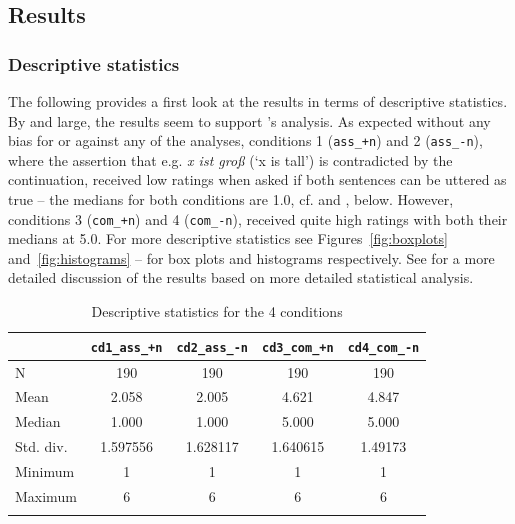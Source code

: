 \documentclass[output=paper]{langsci/langscibook}
\begin{document}
\subsection{Results}

\subsubsection{Descriptive statistics}

The following provides a first look at the results in terms of descriptive statistics. By and large, the results seem to support \citeauthor{umbach2009a_comp}'s \citeyearpar{umbach2009a_comp} analysis. As expected without any bias for or against any of the analyses, conditions 1 (\texttt{ass\_+n}) and 2 (\texttt{\mbox{ass\_-n}}), where the assertion that e.g. \textit{x ist groß} (`x is tall') is contradicted by the continuation, received low ratings when asked if both sentences can be uttered as true -- the medians for both conditions are 1.0, cf.  and , below. However, conditions 3 (\texttt{com\_+n}) and 4 (\texttt{com\_-n}), received quite high ratings with both their medians at 5.0. For more descriptive statistics see Figures~\ref{fig:boxplots} and~\ref{fig:histograms} -- for box plots and histograms respectively. See  for a more detailed discussion of the results based on more detailed statistical analysis.

\begin{table}
\caption{Descriptive statistics for the 4 conditions}
\label{tab:descriptive_stats}
 \begin{tabular}{lSSSS}
  \lsptoprule
	   & \texttt{cd1\_ass\_+n}	& \texttt{cd2\_ass\_-n}	& \texttt{cd3\_com\_+n}	& \texttt{cd4\_com\_-n}	\\
  \midrule
	N	        & 190		& 190		& 190		& 190		\\
	Mean	    & 2.058		& 2.005		& 4.621		& 4.847		\\
	Median	    & 1.000		& 1.000		& 5.000		& 5.000		\\
    Std. div.	& 1.597556	& 1.628117	& 1.640615	& 1.49173	\\
	Minimum		& 1 		& 1 		& 1		    & 1		    \\
	Maximum		& 6	    	& 6	    	& 6		    & 6		    \\
  \lspbottomrule
 \end{tabular}
\end{table}
\end{document}
